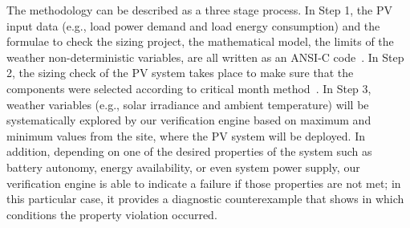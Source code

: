 \documentclass[runningheads]{llncs}
\begin{document}
The methodology can be described as a three stage process. In Step 1, the PV input data (e.g., load power demand and load energy consumption) and the formulae to check the sizing project, the mathematical model, the limits of the weather non-deterministic variables, are all written as an ANSI-C code~\cite{ANSI2018}. In Step 2, the sizing check of the PV system takes place to make sure that the components were selected according to critical month method~\cite{Pinho}. %
%
In Step 3, weather variables (e.g., solar irradiance and ambient temperature) will be systematically explored by our verification engine based on maximum and minimum values from the site, where the PV system will be deployed. 
In addition, depending on one of the desired properties of the system such as battery autonomy, energy availability, or even system power supply, our verification engine is able to indicate a failure if those properties are not met; in this particular case, it provides a diagnostic counterexample that shows in which conditions the property violation occurred. 
%
%
%
%
% 
%
%
%
\end{document}
